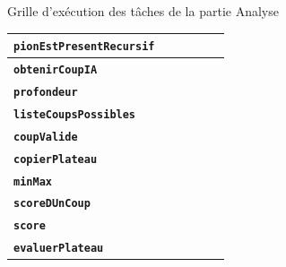 \documentclass{beamer}
\begin{document}
\begin{frame}[label=analyse]
\begin{alertblock}{Grille d’exécution des tâches de la partie \og Analyse \fg}
{\begin{table}[h]
\begin{center}
\begin{tabular}{|l|c|c|c|c|c|}
 		\textbf{\texttt{pionEstPresentRecursif}} & \cellcolor{lightgray} & \cellcolor{lightgray} & \cellcolor{lightgray} & & \\\hline
 		\textbf{\texttt{obtenirCoupIA}} & & & &  \cellcolor{lightgray}&  \cellcolor{lightgray}  \\\hline
 		 		\textbf{\texttt{profondeur}} & & & &  \cellcolor{lightgray}&  \cellcolor{lightgray}  \\\hline
 		 		 		\textbf{\texttt{listeCoupsPossibles}} & & & &  \cellcolor{lightgray}&  \cellcolor{lightgray}  \\\hline
 		  		\textbf{\texttt{coupValide}} & & & &  \cellcolor{lightgray}&  \cellcolor{lightgray}  \\\hline
  		\textbf{\texttt{copierPlateau}} & & & &  \cellcolor{lightgray}&  \cellcolor{lightgray}  \\\hline
   		\textbf{\texttt{minMax}} & & & &  \cellcolor{lightgray}&  \cellcolor{lightgray}  \\\hline
   		 		\textbf{\texttt{scoreDUnCoup}} & & & &  \cellcolor{lightgray}&  \cellcolor{lightgray}  \\\hline
   	 		\textbf{\texttt{score}} & & & &  \cellcolor{lightgray}&  \cellcolor{lightgray}  \\\hline
   	 		 		\textbf{\texttt{evaluerPlateau}} & & & &  \cellcolor{lightgray}&  \cellcolor{lightgray}  \\\hline
\end{tabular}
\end{center}
\end{table}}
	\end{alertblock}
	\end{frame}
	
\end{document}

